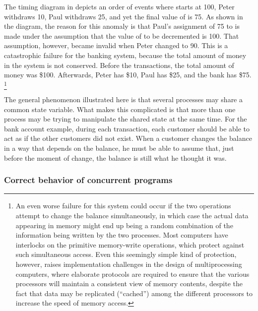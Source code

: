 The timing diagram in  depicts an order of events where  starts at 100, Peter withdraws 10, Paul withdraws 25, and yet the final value of  is 75.
As shown in the diagram, the reason for this anomaly is that Paul’s assignment of 75 to  is made under the assumption that the value of  to be decremented is 100.
That assumption, however, became invalid when Peter changed  to 90.
This is a catastrophic failure for the banking system, because the total amount of money in the system is not conserved.
Before the transactions, the total amount of money was \$100.
Afterwards, Peter has \$10, Paul has \$25, and the bank has \$75.%
\footnote{
	An even worse failure for this system could occur if the two  operations attempt to change the balance simultaneously, in which case the actual data appearing in memory might end up being a random combination of the information being written by the two processes.
	Most computers have interlocks on the primitive memory-write operations, which protect against such simultaneous access.
	Even this seemingly simple kind of protection, however, raises implementation challenges in the design of multiprocessing computers, where elaborate  protocols are required to ensure that the various processors will maintain a consistent view of memory contents, despite the fact that data may be replicated (“cached”) among the different processors to increase the speed of memory access.
}

The general phenomenon illustrated here is that several processes may share a common state variable.
What makes this complicated is that more than one process may be trying to manipulate the shared state at the same time.
For the bank account example, during each transaction, each customer should be able to act as if the other customers did not exist.
When a customer changes the balance in a way that depends on the balance, he must be able to assume that, just before the moment of change, the balance is still what he thought it was.



\subsubsection*{Correct behavior of concurrent programs}

